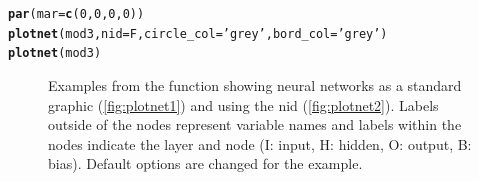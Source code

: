 \documentclass[article,shortnames]{jss}\usepackage[]{graphicx}\usepackage[]{color}
\makeatletter
\newcommand{\hlnum}[1]{\textcolor[rgb]{0.686,0.059,0.569}{#1}}%
\newcommand{\hlstr}[1]{\textcolor[rgb]{0.192,0.494,0.8}{#1}}%
\newcommand{\hlstd}[1]{\textcolor[rgb]{0.345,0.345,0.345}{#1}}%
\newcommand{\hlkwc}[1]{\textcolor[rgb]{0.333,0.667,0.333}{#1}}%
\newcommand{\hlkwd}[1]{\textcolor[rgb]{0.737,0.353,0.396}{\textbf{#1}}}%
\newenvironment{kframe}{%
 \def\at@end@of@kframe{}%
 \ifinner\ifhmode%
  \def\at@end@of@kframe{\end{minipage}}%
  \begin{minipage}{\columnwidth}%
 \fi\fi%
 \def\FrameCommand##1{\hskip\@totalleftmargin \hskip-\fboxsep
 \colorbox{shadecolor}{##1}\hskip-\fboxsep
     \hskip-\linewidth \hskip-\@totalleftmargin \hskip\columnwidth}%
 \MakeFramed {\advance\hsize-\width
   \@totalleftmargin\z@ \linewidth\hsize
   \@setminipage}}%
 {\par\unskip\endMakeFramed%
 \at@end@of@kframe}
\makeatother
\begin{document}
\begin{kframe}
\begin{alltt}
\hlkwd{par}\hlstd{(}\hlkwc{mar} \hlstd{=} \hlkwd{c}\hlstd{(}\hlnum{0}\hlstd{,} \hlnum{0}\hlstd{,} \hlnum{0}\hlstd{,} \hlnum{0}\hlstd{))}
\hlkwd{plotnet}\hlstd{(mod3,} \hlkwc{nid} \hlstd{= F,} \hlkwc{circle_col} \hlstd{=} \hlstr{'grey'}\hlstd{,} \hlkwc{bord_col} \hlstd{=} \hlstr{'grey'}\hlstd{)}
\hlkwd{plotnet}\hlstd{(mod3)}
\end{alltt}
\end{kframe}\begin{figure}[!ht]

{\centering {}

}

\caption{Examples from the  function showing neural networks as a standard graphic (\ref{fig:plotnet1}) and using the \acl{nid} (\ref{fig:plotnet2}).  Labels outside of the nodes represent variable names and labels within the nodes indicate the layer and node (I: input, H: hidden, O: output, B: bias).  Default options are changed for the example.}\label{fig:plotnet}
\end{figure}
\end{document}
